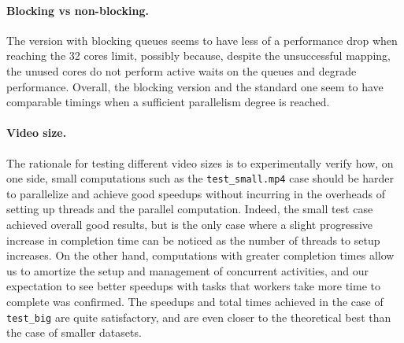 \documentclass{article}
\begin{document}
\paragraph{Blocking vs non-blocking.} The version with blocking queues seems to have less of a performance drop when reaching the 32 cores limit, possibly because, despite the unsuccessful mapping, the unused cores do not perform active waits on the queues and degrade performance. Overall, the blocking version and the standard one seem to have comparable timings when a sufficient parallelism degree is reached.

\paragraph{Video size.} The rationale for testing different video sizes is to experimentally verify how, on one side, small computations such as the \texttt{test\_small.mp4} case should be harder to parallelize and achieve good speedups without incurring in the overheads of setting up threads and the parallel computation. Indeed, the small test case achieved overall good results, but is the only case where a slight progressive increase in completion time can be noticed as the number of threads to setup increases. On the other hand, computations with greater completion times allow us to amortize the setup and management of concurrent activities, and our expectation to see better speedups with tasks that workers take more time to complete was confirmed. The speedups and total times achieved in the case of \texttt{test\_big} are quite satisfactory, and are even closer to the theoretical best than the case of smaller datasets.
\end{document}
